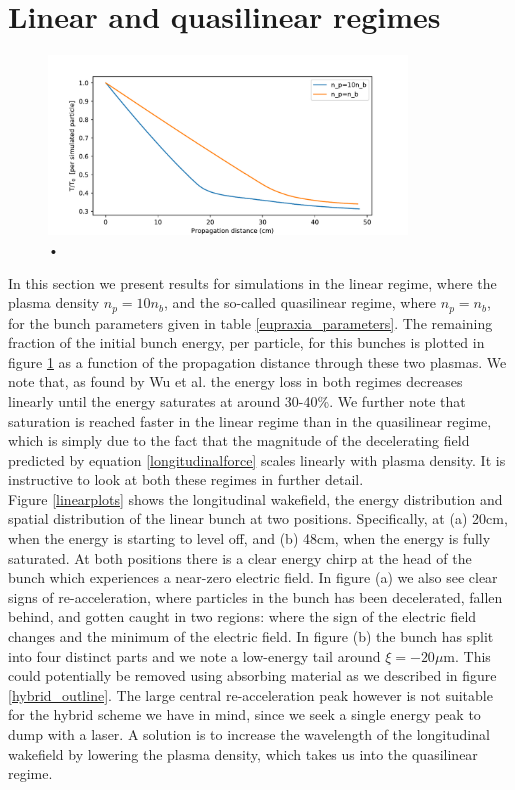 \section{Linear and quasilinear regimes}
\begin{figure}
\centering
\includegraphics[width=0.85\textwidth]{Energy30pc_per_particle_lowres2.pdf}
\caption{•}
\label{energyloss}
\end{figure}
In this section we present results for simulations in the linear regime, where the plasma density $n_p=10n_b$, and the so-called quasilinear regime, where $n_p=n_b$, for the bunch parameters given  in table \ref{eupraxia_parameters}. The remaining fraction of the initial bunch energy, per particle, for this bunches is plotted in figure \ref{energyloss} as a function of the propagation distance through these two plasmas. We note that, as found by Wu et al. \cite{Wu2010} the energy loss in both regimes decreases linearly until the energy saturates at around 30-40\%. We further note that saturation is reached faster in the linear regime than in the quasilinear regime, which is simply due to the fact that the magnitude of the decelerating field predicted by equation \ref{longitudinalforce} scales linearly with plasma density. It is instructive to look at both these regimes in further detail.\\
\indent Figure \ref{linearplots} shows the longitudinal wakefield, the energy distribution and spatial distribution of the linear bunch at two positions. Specifically, at (a) 20cm, when the energy is starting to level off, and (b) 48cm, when the energy is fully saturated. At both positions there is a clear energy chirp at the head of the bunch which experiences a near-zero electric field. In figure (a) we also see clear signs of re-acceleration, where particles in the bunch has been decelerated, fallen behind, and gotten caught in two regions: where the sign of the electric field changes and the minimum of the electric field. In figure (b) the bunch has split into four distinct parts and we note a low-energy tail around $\xi=-20 \mu\text{m}$. This could potentially be removed using absorbing material as we described in figure \ref{hybrid_outline}. The large central re-acceleration peak however is not suitable for the hybrid scheme we have in mind, since we seek a single energy peak to dump with a laser. A solution is  to increase the wavelength of the longitudinal wakefield by lowering the plasma density, which takes us into the quasilinear regime. \\
